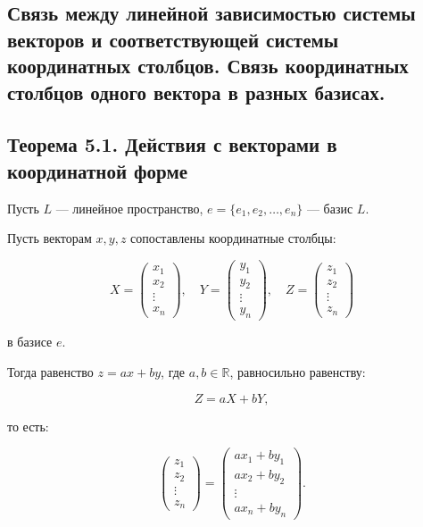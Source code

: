 {
\subsection{Связь между линейной зависимостью системы векторов и соответствующей системы координатных столбцов. Связь координатных столбцов одного вектора в разных базисах.}

\subsection*{Теорема 5.1. Действия с векторами в координатной форме}

Пусть \( L \) — линейное пространство, \( e = \{ e_1, e_2, \dots, e_n \} \) — базис \( L \).

Пусть векторам \( x, y, z \) сопоставлены координатные столбцы:



\[
X = \begin{pmatrix} x_1 \\ x_2 \\ \vdots \\ x_n \end{pmatrix}, \quad Y = \begin{pmatrix} y_1 \\ y_2 \\ \vdots \\ y_n \end{pmatrix}, \quad Z = \begin{pmatrix} z_1 \\ z_2 \\ \vdots \\ z_n \end{pmatrix}
\]



в базисе \( e \).

Тогда равенство \( z = a x + b y \), где \( a, b \in \mathbb{R} \), равносильно равенству:



\[
Z = a X + b Y,
\]



то есть:



\[
\begin{pmatrix} z_1 \\ z_2 \\ \vdots \\ z_n \end{pmatrix} = \begin{pmatrix} a x_1 + b y_1 \\ a x_2 + b y_2 \\ \vdots \\ a x_n + b y_n \end{pmatrix}.
\]


}
